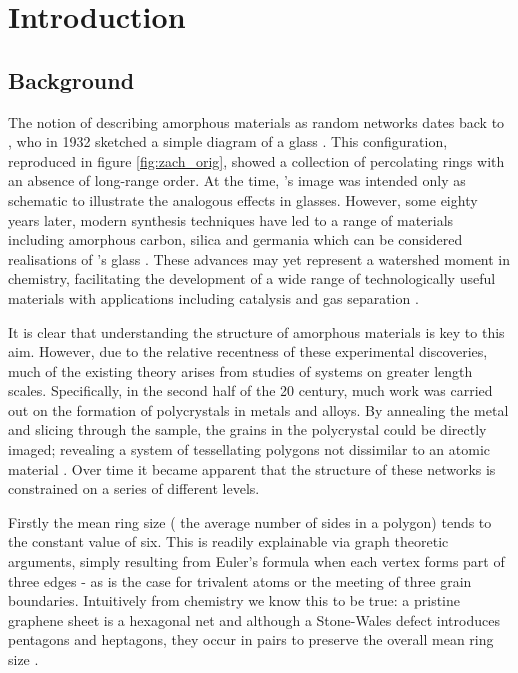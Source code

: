 \chapter{Introduction}
\label{ch:intro}

\section{Background}
\label{s:background}

The notion of describing amorphous materials as random networks dates back to \zach, who in 1932 sketched a simple diagram of a \td{} glass \cite{Zachariasen1932}.
This configuration, reproduced in figure \ref{fig:zach_orig}, showed a collection of percolating rings with an absence of long\--range order.
At the time, \zach's image was intended only as schematic to illustrate the analogous effects in \thd{} glasses.
However, some eighty years later, modern synthesis techniques have led to a range of \td{} materials including amorphous carbon, silica and germania which can be considered realisations of \zach's glass \cite{Kotakoski2011,Robertson2012,Huang2012,Lichtenstein2012a,Shaikhutdinov2013,Lewandowski2018,Lewandowski2019}.
These advances may yet represent a watershed moment in chemistry, facilitating the development of a wide range of technologically useful materials with applications including catalysis and gas separation \cite{Trogadas2014,Sun2015a,Buchner2017}.

It is clear that understanding the structure of amorphous materials is key to this aim.
However, due to the relative recentness of these experimental discoveries, much of the existing theory arises from studies of systems on greater length scales.
Specifically, in the second half of the 20\th{} century, much work was carried out on the formation of polycrystals in metals and alloys.
By annealing the metal and slicing through the sample, the grains in the polycrystal could be directly imaged; revealing a system of tessellating polygons not dissimilar to an atomic material \cite{Beck1954,Dunn1957}.
Over time it became apparent that the structure of these networks is constrained on a series of different levels.

Firstly the mean ring size (\ie{} the average number of sides in a polygon) tends to the constant value of six.
This is readily explainable via graph theoretic arguments, simply resulting from Euler's formula when each vertex forms part of three edges - as is the case for trivalent atoms or the meeting of three grain boundaries.
Intuitively from chemistry we know this to be true: a pristine graphene sheet is a hexagonal net and although a Stone\--Wales defect introduces pentagons and heptagons, they occur in pairs to preserve the overall mean ring size \cite{Stone1986}.

